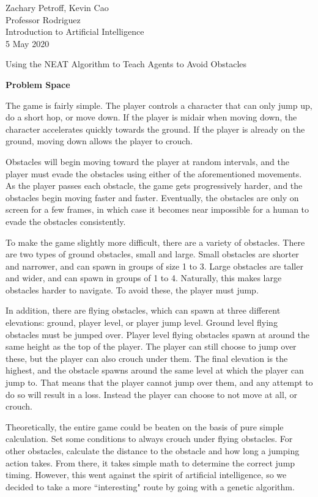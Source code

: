\documentclass[12pt]{article}
\begin{document}
\begin{flushleft}
Zachary Petroff, Kevin Cao \\
Professor Rodriguez \\
Introduction to Artificial Intelligence \\
5 May 2020

\begin{center}
Using the NEAT Algorithm to Teach Agents to Avoid Obstacles
\end{center}

\setlength{\parindent}{0.5in}
\noindent\textbf{Problem Space}

The game is fairly simple. The player controls a character that can only jump up, do a short hop, or move down. If the player is midair when moving down, the character accelerates quickly towards the ground. If the player is already on the ground, moving down allows the player to crouch.

Obstacles will begin moving toward the player at random intervals, and the player must evade the obstacles using either of the aforementioned movements. As the player passes each obstacle, the game gets progressively harder, and the obstacles begin moving faster and faster. Eventually, the obstacles are only on screen for a few frames, in which case it becomes near impossible for a human to evade the obstacles consistently.

To make the game slightly more difficult, there are a variety of obstacles. There are two types of ground obstacles, small and large. Small obstacles are shorter and narrower, and can spawn in groups of size 1 to 3. Large obstacles are taller and wider, and can spawn in groups of 1 to 4. Naturally, this makes large obstacles harder to navigate. To avoid these, the player must jump.

In addition, there are flying obstacles, which can spawn at three different elevations: ground, player level, or player jump level. Ground level flying obstacles must be jumped over. Player level flying obstacles spawn at around the same height as the top of the player. The player can still choose to jump over these, but the player can also crouch under them. The final elevation is the highest, and the obstacle spawns around the same level at which the player can jump to. That means that the player cannot jump over them, and any attempt to do so will result in a loss. Instead the player can choose to not move at all, or crouch.

Theoretically, the entire game could be beaten on the basis of pure simple calculation. Set some conditions to always crouch under flying obstacles. For other obstacles, calculate the distance to the obstacle and how long a jumping action takes. From there, it takes simple math to determine the correct jump timing. However, this went against the spirit of artificial intelligence, so we decided to take a more ``interesting" route by going with a genetic algorithm.


\end{flushleft}
\end{document}
